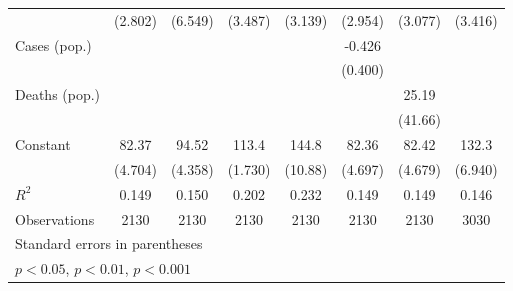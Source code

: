 \documentclass{article}
\begin{document}
{\begin{longtable}{l*{7}{c}}
                &  (2.802)         &  (6.549)         &  (3.487)         &  (3.139)         &  (2.954)         &  (3.077)         &  (3.416)         \\
Cases (pop.)    &                  &                  &                  &                  &   -0.426         &                  &                  \\
                &                  &                  &                  &                  &  (0.400)         &                  &                  \\
Deaths (pop.)   &                  &                  &                  &                  &                  &    25.19         &                  \\
                &                  &                  &                  &                  &                  &  (41.66)         &                  \\
Constant        &    82.37\sym{***}&    94.52\sym{***}&    113.4\sym{***}&    144.8\sym{***}&    82.36\sym{***}&    82.42\sym{***}&    132.3\sym{***}\\
                &  (4.704)         &  (4.358)         &  (1.730)         &  (10.88)         &  (4.697)         &  (4.679)         &  (6.940)         \\
\hline
\(R^{2}\)       &    0.149         &    0.150         &    0.202         &    0.232         &    0.149         &    0.149         &    0.146         \\
Observations    &     2130         &     2130         &     2130         &     2130         &     2130         &     2130         &     3030         \\
\hline\hline
\multicolumn{8}{l}{\footnotesize Standard errors in parentheses}\\
\multicolumn{8}{l}{\footnotesize \sym{*} \(p<0.05\), \sym{**} \(p<0.01\), \sym{***} \(p<0.001\)}\\
\end{longtable}
}
\end{document}
